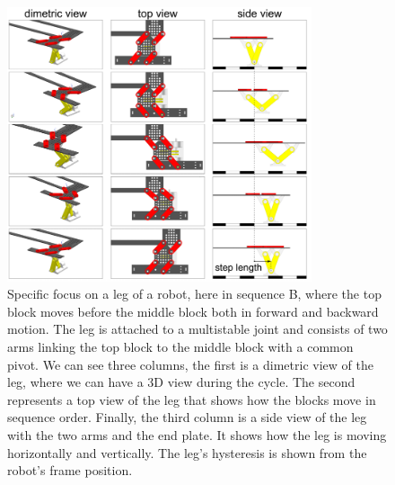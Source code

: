         
        \begin{figure}[h!]
            \centering
            \includegraphics[width=0.8\textwidth]{images/forward_step.png}
            \caption{Specific focus on a leg of a robot, here in sequence B, where the top block moves before the middle block both in forward and backward motion. The leg is attached to a multistable joint and consists of two arms linking the top block to the middle block with a common pivot. We can see three columns, the first is a dimetric view of the leg, where we can have a 3D view during the cycle. The second represents a top view of the leg that shows how the blocks move in sequence order. Finally, the third column is a side view of the leg with the two arms and the end plate. It shows how the leg is moving horizontally and vertically. The leg's hysteresis is shown from the robot's frame position.}
            \label{fig:forward_step}
        \end{figure}
        
